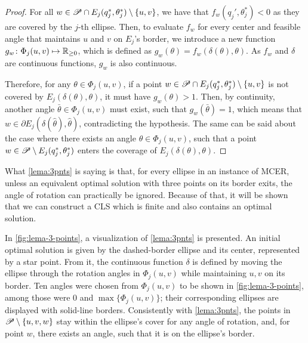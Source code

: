 \begin{proof}
	For all $w\in \mathscr{P} \cap E_j(q_j^*, \theta_j^*)\setminus \{u,v\}$, we have that $f_w(q_j', \theta_j^*) < 0$ as they are covered by the $j$-th ellipse.
	Then, to evaluate $f_w$ for every center and feasible angle that maintains $u$ and $v$ on $E_j$'s border, we introduce a new function $g_w\colon \Phi_j(u,v) \mapsto \mathbb{R}_{\ge0}$, which is defined as $g_w(\theta) = f_w(\delta(\theta), \theta)$.
	As $f_w$ and $\delta$ are continuous functions, $g_w$ is also continuous.
	
	Therefore, for any $\theta\in\Phi_j(u,v)$, if a point $w \in \mathscr{P} \cap E_j(q_j^*, \theta_j^*)\setminus\{u,v\}$ is not covered by $E_j(\delta(\theta), \theta)$, it must have $g_w(\theta)>1$. Then, by continuity, another angle $\bar{\theta} \in \Phi_j(u,v)$ must exist, such that $g_w(\bar{\theta})=1$, which means that $w\in \partial E_j(\delta(\hat{\theta}), \hat{\theta})$, contradicting the hypothesis. The same can be said about the case where there exists an angle $\theta \in \Phi_j(u,v)$, such that a point $w \in \mathscr{P} \setminus E_j(q_j^*, \theta_j^*)$ enters the coverage of $E_j(\delta(\theta), \theta)$.
\end{proof}


What \autoref{lema:3pnts} is saying is that, for every ellipse in an instance of MCER, unless an equivalent optimal solution with three points on its border exits, the angle of rotation can practically be ignored. Because of that, it will be shown that we can construct a CLS which is finite and also contains an optimal solution.

In \autoref{fig:lema-3-points}, a visualization of \autoref{lema:3pnts} is presented.
An initial optimal solution is given by the dashed-border ellipse and its center, represented by a star point. From it, the continuous function $\delta$ is defined by moving the ellipse through the rotation angles in $\Phi_j(u,v)$ while maintaining $u, v$ on its border. Ten angles were chosen from $\Phi_j(u,v)$ to be shown in \autoref{fig:lema-3-points}, among those were $0$ and $\max\{\Phi_j(u,v)\}$; their corresponding ellipses are displayed with solid-line borders.
Consistently with \autoref{lema:3pnts}, the points in $\mathscr{P} \setminus \{u, v, w\}$ stay within the ellipse's cover for any angle of rotation, and, for point $w$, there exists an angle, such that it is on the ellipse's border.  


